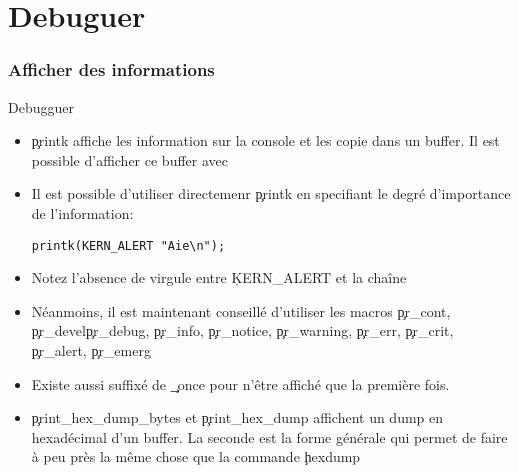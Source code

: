 %
%
%

\part{Debuguer}

\section{Afficher des informations}
\begin{frame}[fragile=singleslide]{Debugguer}
  \begin{itemize} 
  \item \c{printk} affiche les information sur la console et les copie
    dans  un  buffer.  Il  est  possible  d'afficher  ce  buffer  avec
  \item   Il  est  possible   d'utiliser  directemenr   \c{printk}  en
    specifiant le degré d'importance de l'information:
    \begin{lstlisting} 
printk(KERN_ALERT "Aie\n");
    \end{lstlisting} 
  \item Notez l'absence de virgule entre \c{KERN_ALERT} et la chaîne
  \item Néanmoins,  il est maintenant conseillé  d'utiliser les macros
    \c{pr_cont}, \c{pr_devel}\c{pr_debug}, \c{pr_info}, \c{pr_notice},
    \c{pr_warning},     \c{pr_err},     \c{pr_crit},     \c{pr_alert},
    \c{pr_emerg}
  \item Existe aussi  suffixé de \c{_once} pour n'être  affiché que la
    première fois.
  \item  \c{print_hex_dump_bytes} et  \c{print_hex_dump}  affichent un
    dump en hexadécimal d'un buffer.  La seconde est la forme générale
    qui  permet de  faire à  peu près  la même  chose que  la commande
    \c{hexdump}
  \end{itemize}
\end{frame}

